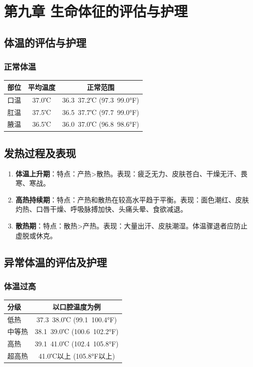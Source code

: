 \documentclass[11pt, a4paper]{ctexart}
\begin{document}
\section{第九章 生命体征的评估与护理}
\subsection{体温的评估与护理}
\subsubsection{正常体温}
\begin{table}[htbp]
\centering
\begin{tabular}{|l|c|c|}
\hline
\textbf{部位} & \textbf{平均温度} & \textbf{正常范围} \\
\hline
口温 & 37.0℃ & 36.3~37.2℃ (97.3~99.0°F) \\
肛温 & 37.5℃ & 36.5~37.7℃ (97.7~99.0°F) \\
腋温 & 36.5℃ & 36.0~37.0℃ (96.8~98.6°F) \\
\hline
\end{tabular}
\end{table}

\subsection{发热过程及表现}
\begin{enumerate}
    \item \textbf{体温上升期}：特点：产热>散热。表现：疲乏无力、皮肤苍白、干燥无汗、畏寒、寒战。
    \item \textbf{高热持续期}：特点：产热和散热在较高水平趋于平衡。表现：面色潮红、皮肤灼热、口唇干燥、呼吸脉搏加快、头痛头晕、食欲减退。
    \item \textbf{散热期}：特点：散热>产热。表现：大量出汗、皮肤潮湿。体温骤退者应防止虚脱或休克。
\end{enumerate}

\subsection{异常体温的评估及护理}
\subsubsection{体温过高}
\begin{table}[htbp]
\centering
\begin{tabular}{|l|c|}
\hline
\textbf{分级} & \textbf{以口腔温度为例} \\
\hline
低热 & 37.3~38.0℃ (99.1~100.4°F) \\
中等热 & 38.1~39.0℃ (100.6~102.2°F) \\
高热 & 39.1~41.0℃ (102.4~105.8°F) \\
超高热 & 41.0℃以上 (105.8°F以上) \\
\hline
\end{tabular}
\end{table}
\end{document}

